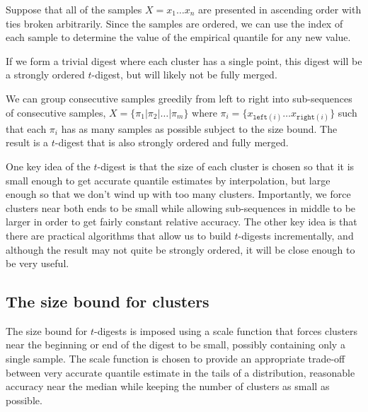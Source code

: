 \documentclass[]{statsoc}
\begin{document}
Suppose that all of the samples $X=x_1 \ldots x_n$ are presented in ascending order with ties broken arbitrarily. Since the samples are ordered, we can use the index of each sample to determine the value of the empirical quantile for any new value. 

If we form a trivial digest where each cluster has a single point, this digest will be a strongly ordered $t$-digest, but will likely not be fully merged.

We can group consecutive samples greedily from left to right into sub-sequences of consecutive samples, $X = \lbrace \pi_1 | \pi_2 | \ldots | \pi_m \rbrace$ where $\pi_i = \lbrace x_{\mathtt {left}(i)} \ldots x_{\mathtt{right}(i)} \rbrace$ such that each $\pi_i$ has as many samples as possible subject to the size bound. The result is a $t$-digest that is also strongly ordered and fully merged.

One key idea of the $t$-digest is that the size of each cluster is chosen so that it is small enough to get accurate quantile estimates by interpolation, but large enough so that we don't wind up with too many clusters. Importantly, we force clusters near both ends to be small while allowing sub-sequences in middle to be larger in order to get fairly constant relative accuracy. The other key idea is that there are practical algorithms that allow us to build $t$-digests incrementally, and although the result may not quite be strongly ordered, it will be close enough to be very useful.

\subsection{The size bound for clusters}
The size bound for $t$-digests is imposed using a scale function that forces clusters near the beginning or end of the digest to be small, possibly containing only a single sample. The scale function is chosen to provide an appropriate trade-off between very accurate quantile estimate in the tails of a distribution, reasonable accuracy near the median while keeping the number of clusters as small as possible.
\end{document}
